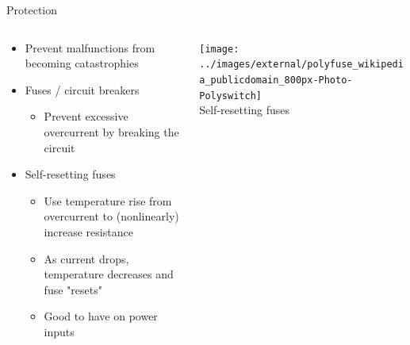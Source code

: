\documentclass{beamer}
\begin{document}
\begin{frame}{Protection}
  \begin{columns}[T]
    \begin{column}{.6\textwidth}
      \begin{itemize}
        \item Prevent malfunctions from becoming catastrophies
        \item Fuses / circuit breakers
        \begin{itemize}
          \item Prevent excessive overcurrent by breaking the circuit
        \end{itemize}
        \item Self-resetting fuses
        \begin{itemize}
          \item Use temperature rise from overcurrent to (nonlinearly) increase resistance
          \item As current drops, temperature decreases and fuse "resets"
          \item Good to have on power inputs
        \end{itemize}
      \end{itemize}
    \end{column}

    \begin{column}{0.4\textwidth} \centering
      \texttt{[image: ../images/external/polyfuse\_wikipedia\_publicdomain\_800px-Photo-Polyswitch]} \\
      Self-resetting fuses \\
    \end{column}
  \end{columns}
\end{frame}
\end{document}
